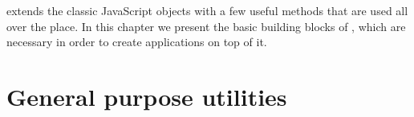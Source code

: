 \begin{intro}
  \TheLibName{} extends the classic JavaScript objects with a few useful
  methods that are used all over the place.  In this chapter we present the
  basic building blocks of \TheLibName{}, which are necessary in order to
  create applications on top of it.
\end{intro}

\section{General purpose utilities}\label{sec:jslib}

